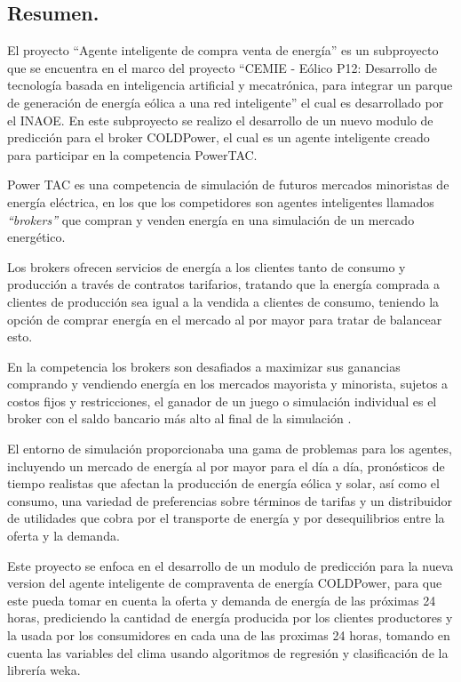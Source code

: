\begin{center}
	\section*{Resumen.}   
El proyecto ``Agente inteligente de compra venta de energía'' es un subproyecto que se encuentra en el marco del proyecto 
``CEMIE - Eólico P12: Desarrollo de tecnología basada en inteligencia artificial y mecatrónica, para integrar un parque de generación de energía eólica a una red inteligente'' 
el cual es desarrollado por el INAOE. 
En este subproyecto se realizo el desarrollo de un nuevo modulo de predicción para el broker COLDPower, el cual es un agente inteligente creado para participar en la competencia PowerTAC. 

Power TAC es una competencia de simulación de futuros mercados minoristas de energía eléctrica, en los que los competidores son agentes inteligentes llamados \textit{``brokers''} que compran y venden energía en una simulación de un mercado energético. 

Los brokers ofrecen servicios de energía a los clientes tanto de consumo y producción a través de contratos tarifarios, tratando que la energía comprada a clientes de producción sea igual a la vendida a clientes de consumo, teniendo la opción de comprar energía en el mercado al por mayor para tratar de balancear esto.

En la competencia los brokers son desafiados a maximizar sus ganancias comprando y vendiendo energía en los mercados mayorista y minorista, sujetos a costos fijos y restricciones, el ganador de un juego o simulación individual es el broker con el saldo bancario más alto al final de la simulación \cite{WKetterJCollinsyMdWeerdtThe2017PowerTAC}.

El entorno  de simulación proporcionaba una gama de problemas para los agentes, incluyendo un mercado de energía al por mayor para el día a día, pronósticos de tiempo realistas que afectan la producción de energía eólica y solar, así como el consumo, una variedad de preferencias sobre términos de tarifas y un distribuidor de utilidades que cobra por el transporte de energía y por desequilibrios entre la oferta y la demanda.

Este proyecto se enfoca en el desarrollo de un modulo de predicción para la nueva version del agente inteligente de compraventa de energía COLDPower, para que este pueda tomar en cuenta la oferta y demanda de energía de las próximas 24 horas,  prediciendo la cantidad de energía producida por los clientes productores y la usada por los consumidores en cada una de las proximas 24 horas, tomando en cuenta las variables del clima usando algoritmos de regresión y clasificación de la librería weka.

\end{center}